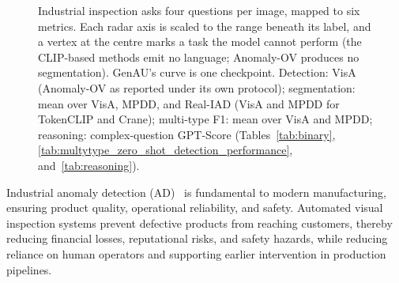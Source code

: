 \begin{figure}[t]
    \caption{Industrial inspection asks four questions per image, mapped to six metrics.
    Each radar axis is scaled to the range beneath its label, and a vertex at the
    centre marks a task the model cannot perform (the CLIP-based methods emit no
    language; Anomaly-OV produces no segmentation). GenAU's curve is one checkpoint.
    Detection: VisA (Anomaly-OV as reported under its own protocol); segmentation:
    mean over VisA, MPDD, and Real-IAD (VisA and MPDD for TokenCLIP and Crane);
    multi-type F1: mean over VisA and MPDD; reasoning: complex-question GPT-Score
    (Tables~\ref{tab:binary}, \ref{tab:multytype_zero_shot_detection_performance}, and~\ref{tab:reasoning}).
    }
    \label{fig:motivation}
\end{figure}
Industrial anomaly detection (AD)~\cite{ad-survery, ad-review} is fundamental to modern manufacturing, ensuring product quality, operational reliability, and safety. Automated visual inspection systems prevent defective products from reaching customers, thereby reducing financial losses, reputational risks, and safety hazards, while reducing reliance on human operators and supporting earlier intervention in production pipelines.
